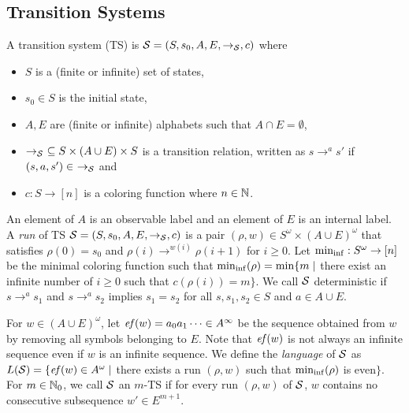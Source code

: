 \subsection{Transition Systems}
\begin{definition}
A {transition system} (TS)
is ${\cal S}=(S, s_0, A, E, \to_{\cal S}, c)$ where
\begin{itemize}
\item $S$ is a (finite or infinite) set of states,
\item $s_0\in S$ is the initial state,
\item $A, E$ are (finite or infinite) alphabets such that $A\cap E = \emptyset$,
\item $\to_{\cal S}\ \subseteq S\times(A\cup E)\times S$ is a transition relation, written as $s\to^a s'$ if $(s,a,s')\in\ \to_{\cal S}$ and
\item $c: S \to [n]$ is a coloring function where $n\in \mathbb{N}$.
\end{itemize}
\end{definition}
An element of $A$ is an observable label and an element of $E$ is an internal label.
A \emph{run} of TS ${\cal S}=(S, s_0, A, E, \to_{\cal S}, c)$ is
a pair $(\rho, w)\in S^\omega \times (A\cup E)^\omega$ that satisfies
$\rho(0)=s_0$ and $\rho(i)\to^{w(i)}\rho(i+1)$ for $i\geq 0$.
Let ${\rm min_{inf}}: S^\omega \to [n]$ be the minimal coloring function such that
${\rm min_{inf}}(\rho)={\rm min}\{m\mid$ there exist an infinite number of $i\geq 0$ such that $c(\rho(i)) = m\}$.
We call ${\cal S}$ deterministic if $s\to^a s_1$ and $s\to^a s_2$ implies $s_1=s_2$ for all $s,s_1,s_2\in S$ and $a\in A\cup E$.

For $w\in (A\cup E)^\omega$, let
$\mathit{ef}(w) = a_0a_1\cdots\in A^\infty$ be the sequence obtained from $w$ by removing all symbols belonging to $E$.
Note that $\mathit{ef}(w)$ is not always an infinite sequence even if $w$ is an infinite sequence.
We define the \emph{language} of ${\cal S}$ as
$L({\cal S})=\{\mathit{ef}(w)\in A^\omega\mid$
there exists a run $(\rho,w)$ such that ${\rm min_{inf}}(\rho)$ is even$\}$.
For $m\in\mathbb{N}_0$, we call ${\cal S}$ an $m$-TS
if for every run $(\rho,w)$ of ${\cal S}$,
$w$ contains no consecutive subsequence $w'\in E^{m+1}$.



